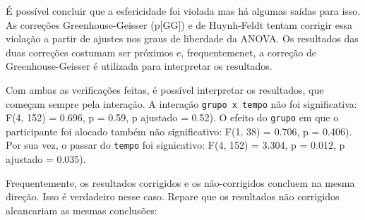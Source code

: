 \documentclass[
]{book}
\newenvironment{Shaded}{\begin{snugshade}}{\end{snugshade}}
\newcommand{\KeywordTok}[1]{\textcolor[rgb]{0.13,0.29,0.53}{\textbf{#1}}}
\newcommand{\NormalTok}[1]{#1}
\newcommand{\OperatorTok}[1]{\textcolor[rgb]{0.81,0.36,0.00}{\textbf{#1}}}
\newcommand{\StringTok}[1]{\textcolor[rgb]{0.31,0.60,0.02}{#1}}
\begin{document}
É possível concluir que a esfericidade foi violada mas há algumas saídas
para isso. As correções Greenhouse-Geisser (p{[}GG{]}) e de Huynh-Feldt
tentam corrigir essa violação a partir de ajustes nos graus de liberdade
da ANOVA. Os resultados das duas correções costumam ser próximos e,
frequentemenet, a correção de Greenhouse-Geisser é utilizada para
interpretar os resultados.

Com ambas as verificações feitas, é possível interpretar os resultados,
que começam sempre pela interação. A interação \texttt{grupo\ x\ tempo}
não foi significativa: F(4, 152) = 0.696, p = 0.59, p ajustado = 0.52).
O efeito do \texttt{grupo} em que o participante foi alocado também não
significativo: F(1, 38) = 0.706, p = 0.406). Por sua vez, o passar do
\texttt{tempo} foi signicativo: F(4, 152) = 3.304, p = 0.012, p ajustado
= 0.035).

Frequentemente, os resultados corrigidos e os não-corrigidos concluem na
mesma direção. Isso é verdadeiro nesse caso. Repare que os resultados
não corrigidos alcancariam as mesmas conclusões:

\begin{Shaded}
\end{Shaded}
\end{document}
